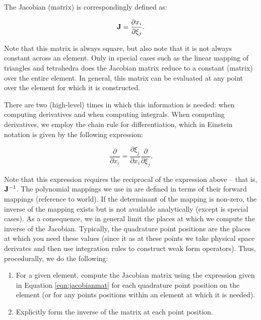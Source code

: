 The Jacobian (matrix) is correspondingly defined as:

\begin{equation} \label{eqn:jacobianmat}
{\bf J} = \frac{\partial x_i}{\partial \xi_j}.
\end{equation}

Note that this matrix is always square, but also note that it is not always constant across an element.  Only in special cases such as the 
linear mapping of triangles and tetrahedra does the Jacobian matrix reduce to a constant (matrix) over the entire element.  In general, 
this matrix can be evaluated at any point over the element for which it is constructed.

There are two (high-level) times in which this information is needed: when computing derivatives and when computing
integrals.  When computing derivatives, we employ the chain rule for differentiation, which in Einstein notation is given by the following expression:

$$
\frac{\partial}{\partial x_i} = \frac{\partial \xi_j}{\partial x_i} \frac{\partial}{\partial \xi_j}.
$$

Note that this expression requires the reciprocal of the expression above -- that is, ${\bf J}^{-1}$.  The polynomial mappings we use in {\nek}
are defined in terms of their forward mappings (reference to world).  If the determinant of the mapping is non-zero, the inverse of the mapping
exists but is not available analytically (except is special cases).  As a consequence, we in general limit the places at which we compute
the inverse of the Jacobian.  Typically, the quadrature point positions are the places at which you need these values (since it as at these
points we take physical space derivates and then use integration rules to construct weak form operators).  Thus, procedurally, we do the following:

\begin{enumerate}
\item For a given element, compute the Jacobian matrix using the expression given in Equation \ref{eqn:jacobianmat} for each quadrature point
position on the element (or for any points positions within an element at which it is needed).
\item Explicitly form the inverse of the matrix at each point position.
\end{enumerate}

